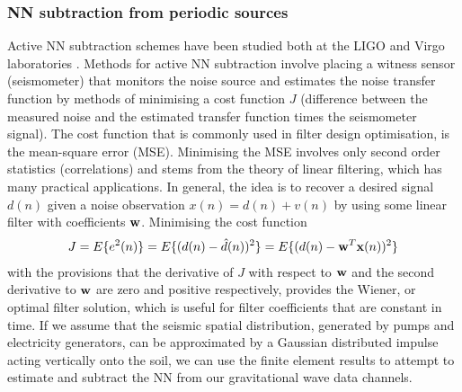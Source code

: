 \subsubsection{NN subtraction from periodic sources}
\label{subsub:NNsubtractionperiodic}
Active NN subtraction schemes have been studied both at the LIGO and Virgo laboratories \cite{Beker2010GRG, Pepper2007, Harms22009}. Methods for active NN subtraction involve placing a witness sensor (seismometer) that monitors the noise source and estimates the noise transfer function by methods of minimising a cost function $J$ (difference between the measured noise and the estimated transfer function times the seismometer signal). The cost function that is commonly used in filter design optimisation, is the mean-square error (MSE). Minimising the MSE involves only second order statistics (correlations) and stems from the theory of linear filtering, which has many practical applications. In general, the idea is to recover a desired signal $d(n)$ given a noise observation $x(n)=d(n)+v(n)$ by using some linear filter with coefficients ${\bf w}$. Minimising the cost function 
\begin{eqnarray}
		J=  E\{e^{2}(n)\} = E\{ (d(n)-\hat{d}(n))^{2}\} = E\{ (d(n)- {\bf w}^{T}{\bf x}(n))^{2}\} 
\end{eqnarray}
with the provisions that the derivative of $J$ with respect to ${\bf w}$ and the second derivative to ${\bf w}$ are zero and positive respectively, provides the Wiener, or optimal filter solution, which is useful for filter coefficients that are constant in time. If we assume that the seismic spatial distribution, generated by pumps and electricity generators, can be approximated by a Gaussian distributed impulse acting vertically onto the soil, we can use the finite element results to attempt to estimate and subtract the NN from our gravitational wave data channels. 
